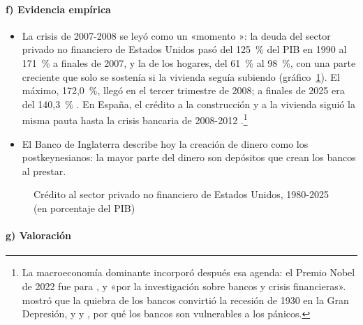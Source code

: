 \documentclass[11pt]{article}
\begin{document}
\paragraph{f) Evidencia empírica}

\begin{itemize}
\item La crisis de 2007-2008 se leyó como un «momento »\nocite{Cassidy2008Minsky}: la deuda del sector privado no financiero de Estados Unidos pasó del 125~\% del PIB en 1990 al 171~\% a finales de 2007, y la de los hogares, del 61~\% al 98~\%, con una parte creciente que solo se sostenía si la vivienda seguía subiendo (gráfico~\ref{fig:deuda-privada}). El máximo, 172,0~\%, llegó en el tercer trimestre de 2008; a finales de 2025 era del 140,3~\%\nocite{BIS2026Credito} . En España, el crédito a la construcción y a la vivienda siguió la misma pauta hasta la crisis bancaria de 2008-2012 .\footnote{La macroeconomía dominante incorporó después esa agenda: el Premio Nobel de 2022 fue para ,  y  «por la investigación sobre bancos y crisis financieras»\nocite{Nobel2022}.  mostró que la quiebra de los bancos convirtió la recesión de 1930 en la Gran Depresión, y  y , por qué los bancos son vulnerables a los pánicos.}
\item El Banco de Inglaterra describe hoy la creación de dinero como los postkeynesianos: la mayor parte del dinero son depósitos que crean los bancos al prestar\nocite{McLeayRadiaThomas2014Money}.
\end{itemize}

\begin{figure}[H]
\centering
\caption{Crédito al sector privado no financiero de Estados Unidos, 1980-2025 (en porcentaje del PIB)}\label{fig:deuda-privada}
\end{figure}

\paragraph{g) Valoración}
\end{document}
